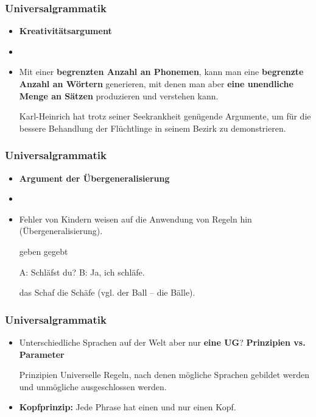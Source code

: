 \begin{frame}
\frametitle{Universalgrammatik}

\begin{itemize}
	\item \textbf{Kreativitätsargument}
	\item[]
	\item Mit einer \textbf{begrenzten Anzahl an Phonemen}, kann man eine \textbf{begrenzte Anzahl an Wörtern} generieren, mit denen man aber \textbf{eine unendliche Menge an Sätzen} produzieren und verstehen kann.

\pause	
	\ea Karl-Heinrich hat trotz seiner Seekrankheit genügende Argumente, um für die bessere Behandlung der Flüchtlinge in seinem Bezirk zu demonstrieren.
	\z

\end{itemize}

\end{frame}


\begin{frame}
\frametitle{Universalgrammatik}

\begin{itemize}
	\item \textbf{Argument der Übergeneralisierung}
	\item[]
	\item Fehler von Kindern weisen auf die Anwendung von Regeln hin (Übergeneralisierung).

\pause	
	\eal 
	\ex geben
	\ex gegebt
	\zl
	
	\eal 
	\ex A: Schläfst du?
	\ex B: Ja, ich schläfe.
	\zl
	
	\eal 
	\ex das Schaf
	\ex die Schäfe (vgl. der Ball -- die Bälle).
	\zl

\end{itemize}

\end{frame}


\begin{frame}
\frametitle{Universalgrammatik}

\begin{itemize}
	\item Unterschiedliche Sprachen auf der Welt aber nur \textbf{eine UG}? \ras \textbf{Prinzipien vs. Parameter}

	\begin{block}{Prinzipien}
	Universelle Regeln, nach denen mögliche Sprachen gebildet werden und unmögliche ausgeschlossen werden. 
	\end{block}
	
	\item \textbf{Kopfprinzip:} Jede Phrase hat einen und nur einen Kopf.

\pause
	\eal 
	\zl
	
\end{itemize}

\end{frame}


